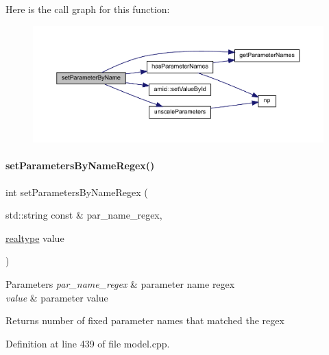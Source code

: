 Here is the call graph for this function\+:
\nopagebreak
\begin{figure}[H]
\begin{center}
\leavevmode
\includegraphics[width=350pt]{classamici_1_1_model_a6c5ceb2ba684cf68a7f21ad865091200_cgraph}
\end{center}
\end{figure}
\mbox{\label{classamici_1_1_model_a1307ed45ccda80e84174d6b495c85d8d}} 
\paragraph{\texorpdfstring{set\+Parameters\+By\+Name\+Regex()}{setParametersByNameRegex()}}
{\footnotesize\ttfamily int set\+Parameters\+By\+Name\+Regex (\begin{DoxyParamCaption}\item[{std\+::string const \&}]{par\+\_\+name\+\_\+regex,  }\item[{\mbox{\hyperlink{namespaceamici_a1bdce28051d6a53868f7ccbf5f2c14a3}{realtype}}}]{value }\end{DoxyParamCaption})}


\begin{DoxyParams}{Parameters}
{\em par\+\_\+name\+\_\+regex} & parameter name regex \\
\hline
{\em value} & parameter value \\
\hline
\end{DoxyParams}
\begin{DoxyReturn}{Returns}
number of fixed parameter names that matched the regex 
\end{DoxyReturn}


Definition at line 439 of file model.\+cpp.

